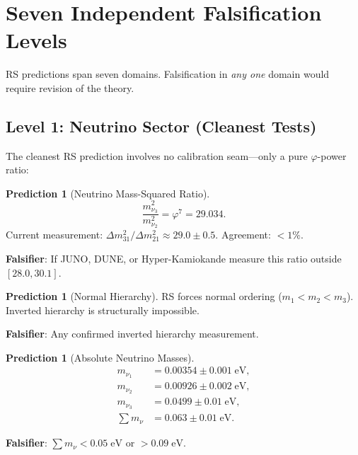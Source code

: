 \documentclass[12pt,a4paper]{article}
\theoremstyle{definition}
\newtheorem{prediction}[theorem]{Prediction}
\theoremstyle{remark}
\begin{document}
\section{Seven Independent Falsification Levels}
\label{sec:falsifiers}

RS predictions span seven domains.  Falsification in \emph{any one}
domain would require revision of the theory.

\subsection{Level 1: Neutrino Sector (Cleanest Tests)}

The cleanest RS prediction involves no calibration seam---only a pure
$\varphi$-power ratio:

\begin{prediction}[Neutrino Mass-Squared Ratio]
\label{pred:nu-ratio}
\begin{equation}
  \boxed{\frac{m_{\nu_3}^2}{m_{\nu_2}^2} = \varphi^7 = 29.034.}
\end{equation}
Current measurement: $\Delta m^2_{31}/\Delta m^2_{21} \approx
29.0 \pm 0.5$.  Agreement: $< 1\%$.
\end{prediction}

\textbf{Falsifier}: If JUNO, DUNE, or Hyper-Kamiokande measure this
ratio outside $[28.0, 30.1]$.

\begin{prediction}[Normal Hierarchy]
RS forces normal ordering ($m_1 < m_2 < m_3$).  Inverted hierarchy is
structurally impossible.
\end{prediction}

\textbf{Falsifier}: Any confirmed inverted hierarchy measurement.

\begin{prediction}[Absolute Neutrino Masses]
\begin{align}
  m_{\nu_1} &= 0.00354 \pm 0.001\;\mathrm{eV}, \\
  m_{\nu_2} &= 0.00926 \pm 0.002\;\mathrm{eV}, \\
  m_{\nu_3} &= 0.0499 \pm 0.01\;\mathrm{eV}, \\
  \textstyle\sum m_\nu &= 0.063 \pm 0.01\;\mathrm{eV}.
\end{align}
\end{prediction}

\textbf{Falsifier}: $\sum m_\nu < 0.05\;\mathrm{eV}$ or $> 0.09\;
\mathrm{eV}$.
\end{document}
